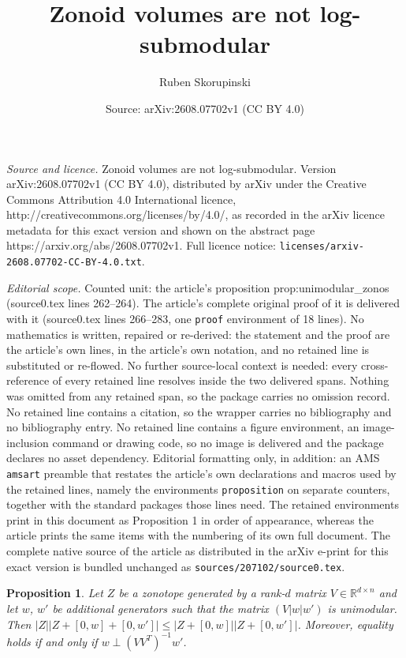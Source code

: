 \documentclass[10pt,a4paper]{amsart}
\title{Zonoid volumes are not log-submodular}
\author{Ruben Skorupinski}
\date{Source: arXiv:2608.07702v1 (CC BY 4.0)}
\newtheorem{proposition}{Proposition}
\newcommand{\R}{\mathbb{R}}
\begin{document}
\maketitle

\noindent\emph{Source and licence.} Zonoid volumes are not log-submodular. Version arXiv:2608.07702v1 (CC BY 4.0), distributed by arXiv under the Creative Commons Attribution 4.0 International licence, http://creativecommons.org/licenses/by/4.0/, as recorded in the arXiv licence metadata for this exact version and shown on the abstract page https://arxiv.org/abs/2608.07702v1. Full licence notice: \texttt{licenses/arxiv-2608.07702-CC-BY-4.0.txt}.\par\smallskip

\noindent\textit{Editorial scope.} Counted unit: the article's proposition prop:unimodular\_zonos (source0.tex lines 262--264). The article's complete original proof of it is delivered with it (source0.tex lines 266--283, one \texttt{proof} environment of 18 lines). No mathematics is written, repaired or re-derived: the statement and the proof are the article's own lines, in the article's own notation, and no retained line is substituted or re-flowed.  No further source-local context is needed: every cross-reference of every retained line resolves inside the two delivered spans.  Nothing was omitted from any retained span, so the package carries no omission record.  No retained line contains a citation, so the wrapper carries no bibliography and no bibliography entry.  No retained line contains a figure environment, an image-inclusion command or drawing code, so no image is delivered and the package declares no asset dependency.  Editorial formatting only, in addition: an AMS \texttt{amsart} preamble that restates the article's own declarations and macros used by the retained lines, namely the environments \texttt{proposition} on separate counters, together with the standard packages those lines need.  The retained environments print in this document as Proposition 1 in order of appearance, whereas the article prints the same items with the numbering of its own full document.  The complete native source of the article as distributed in the arXiv e-print for this exact version is bundled unchanged as \texttt{sources/207102/source0.tex}.
\begin{proposition} \label{prop:unimodular_zonos}
    Let $Z$ be a zonotope generated by a rank-$d$ matrix $V \in \R^{d \times n}$ and let $w$, $w'$ be additional generators such that the matrix $(V|w|w')$ is unimodular. Then $|Z||Z+[0,w]+[0,w']| \leq |Z+[0,w]||Z+[0,w']|$. Moreover, equality holds if and only if $w\perp (VV^T)^{-1}w'$.
\end{proposition}
\end{document}

